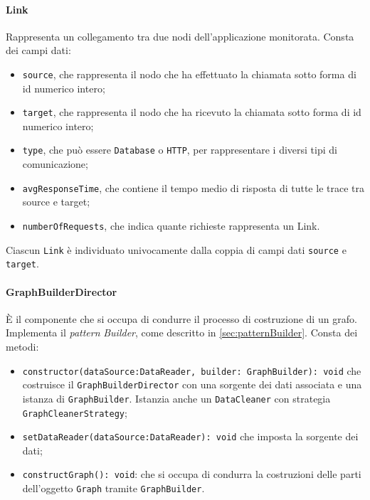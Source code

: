 \paragraph{Link}\Spazio
Rappresenta un collegamento tra due nodi dell'applicazione monitorata. Consta dei campi dati:
\begin{itemize}
	\item{\texttt{source}, che rappresenta il nodo che ha effettuato la chiamata sotto forma di id numerico intero;}
	\item{\texttt{target}, che rappresenta il nodo che ha ricevuto la chiamata sotto forma di id numerico intero;}
	\item{\texttt{type}, che può essere \texttt{Database} o \texttt{HTTP}, per rappresentare i diversi tipi di comunicazione;}
	\item{\texttt{avgResponseTime}, che contiene il tempo medio di risposta di tutte le trace tra source e target;}
	\item{\texttt{numberOfRequests}, che indica quante richieste rappresenta un Link.}
\end{itemize}
Ciascun \texttt{Link} è individuato univocamente dalla coppia di campi dati \texttt{source} e \texttt{target}.

\paragraph{GraphBuilderDirector} \Spazio
È il componente che si occupa di condurre il processo di costruzione di un grafo. Implementa il \emph{pattern} \emph{Builder}, come descritto in \ref{sec:patternBuilder}. Consta dei metodi:
\begin{itemize}
	\item \texttt{constructor(dataSource:DataReader, builder: GraphBuilder): void} che costruisce il \texttt{GraphBuilderDirector} con una sorgente dei dati associata e una istanza di \texttt{GraphBuilder}. Istanzia anche un \texttt{DataCleaner} con strategia \texttt{GraphCleanerStrategy}; 
	\item \texttt{setDataReader(dataSource:DataReader): void} che imposta la sorgente dei dati; 
	\item \texttt{constructGraph(): void}: che si occupa di condurra la costruzioni delle parti dell'oggetto \texttt{Graph} tramite \texttt{GraphBuilder}.
\end{itemize}

